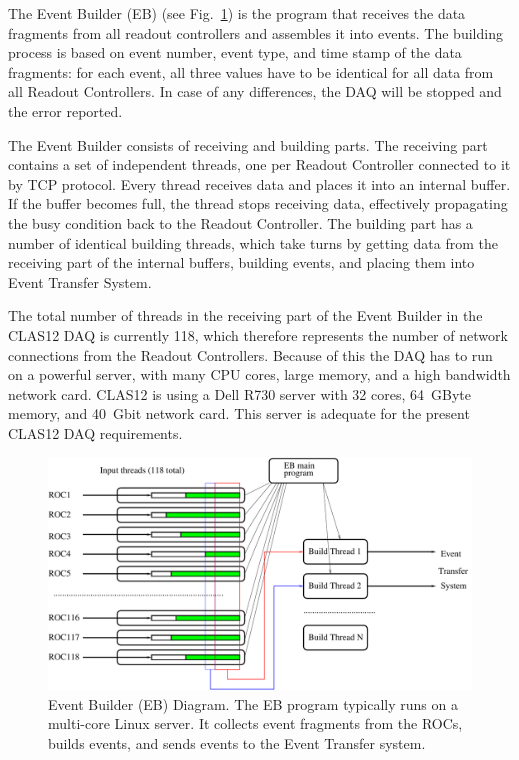 The Event Builder (EB) (see Fig.~\ref{fig:eb_diagram}) is the program that receives the data fragments from all readout
controllers and assembles it into events. The building process is based on event number, event type, and time stamp of the
data fragments: for each event, all three values have to be identical for all data from all Readout Controllers. In case of any
differences, the DAQ will be stopped and the error reported.

The Event Builder consists of receiving and building parts. The receiving part contains a set of independent threads, one
per Readout Controller connected to it by TCP protocol. Every thread receives data and places it into an internal buffer. If
the buffer becomes full, the thread stops receiving data, effectively propagating the busy condition back to the Readout
Controller. The building part has a number of identical building threads, which take turns by getting data from the
receiving part of the internal buffers, building events, and placing them into Event Transfer System.

The total number of threads in the receiving part of the Event Builder in the CLAS12 DAQ is currently 118, which
therefore represents the number of network connections from the Readout Controllers. Because of this the DAQ has
to run on a powerful server, with many CPU cores, large memory, and a high bandwidth network card. CLAS12 is using a
Dell R730 server with 32 cores, 64~GByte memory, and 40~Gbit network card. This server is adequate for the present
CLAS12 DAQ requirements.

\begin{figure}[hbt]
	\centering
	\includegraphics[width=1.0\columnwidth,keepaspectratio]{img/eb_diagram.pdf}
	\caption{Event Builder (EB) Diagram. The EB program typically runs on a multi-core Linux server. It collects event
          fragments from the ROCs, builds events, and sends events to the Event Transfer system.}
	\label{fig:eb_diagram}
\end{figure}

